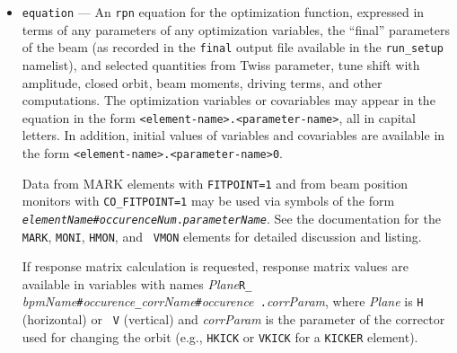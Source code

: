 \documentclass[11pt]{article}
\begin{document}
\begin{itemize}
\item \verb|equation| --- An {\tt rpn} equation for the optimization
function, expressed in terms of any parameters of any optimization
variables, the ``final'' parameters of the beam (as recorded in the
\verb|final| output file available in the \verb|run_setup| namelist),
and selected quantities from Twiss parameter, tune shift with amplitude,
closed orbit, beam moments, driving terms, and other computations.
The optimization variables or covariables may appear in the equation
in the form \verb|<element-name>.<parameter-name>|, all in capital
letters.  In addition, initial values of variables and covariables
are available in the form \verb|<element-name>.<parameter-name>0|.

Data from MARK elements with {\tt FITPOINT=1} and from beam position
monitors with {\tt CO\_FITPOINT=1} may be used via symbols of the form
{\tt {\em elementName}\#{\em occurenceNum}.{\em parameterName}}.  See the
documentation for the {\tt MARK}, {\tt MONI}, {\tt HMON}, and {\tt
VMON} elements for detailed discussion and listing.

If response matrix calculation is requested, response matrix values
are available in variables with names {\em Plane}{\tt R\_}{\em
bpmName}\verb|#|{\em occurence}{\tt \_}{\em corrName}\verb|#|{\em occurence}{\tt
.}{\em corrParam}, where {\em Plane} is {\tt H} (horizontal) or {\tt
V} (vertical) and {\em corrParam} is the parameter of the corrector
used for changing the orbit (e.g., {\tt HKICK} or {\tt VKICK} for a
{\tt KICKER} element).


\end{itemize}
\end{document}
